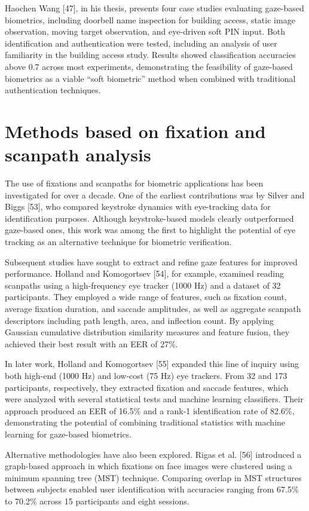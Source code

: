 \documentclass[12pt]{report}
\begin{document}
Haochen Wang [47], in his thesis, presents four case studies evaluating gaze-based biometrics, including doorbell name inspection for building access, static image observation, moving target observation, and eye-driven soft PIN input.
Both identification and authentication were tested, including an analysis of user familiarity in the building access study. 
Results showed classification accuracies above 0.7 across most experiments, demonstrating the feasibility of gaze-based biometrics as a viable “soft biometric” method when combined with traditional authentication techniques.

\section{Methods based on fixation and scanpath analysis}

The use of fixations and scanpaths for biometric applications has been investigated for over a decade.
One of the earliest contributions was by Silver and Biggs [53], who compared keystroke dynamics with eye-tracking data for identification purposes. 
Although keystroke-based models clearly outperformed gaze-based ones, this work was among the first to highlight the potential of eye tracking as an alternative technique for biometric verification.

Subsequent studies have sought to extract and refine gaze features for improved performance. 
Holland and Komogortsev [54], for example, examined reading scanpaths using a high-frequency eye tracker (1000 Hz) and a dataset of 32 participants. 
They employed a wide range of features, such as fixation count, average fixation duration, and saccade amplitudes, as well as aggregate scanpath descriptors including path length, area, and inflection count.
By applying Gaussian cumulative distribution similarity measures and feature fusion, they achieved their best result with an EER of 27\%. 

In later work, Holland and Komogortsev [55] expanded this line of inquiry using both high-end (1000 Hz) and low-cost (75 Hz) eye trackers. 
From 32 and 173 participants, respectively, they extracted fixation and saccade features, which were analyzed with several statistical tests and machine learning classifiers. 
Their approach produced an EER of 16.5\% and a rank-1 identification rate of 82.6\%, demonstrating the potential of combining traditional statistics with machine learning for gaze-based biometrics.

Alternative methodologies have also been explored. 
Rigas et al. [56] introduced a graph-based approach in which fixations on face images were clustered using a minimum spanning tree (MST) technique.
Comparing overlap in MST structures between subjects enabled user identification with accuracies ranging from 67.5\% to 70.2\% across 15 participants and eight sessions.
\end{document}
